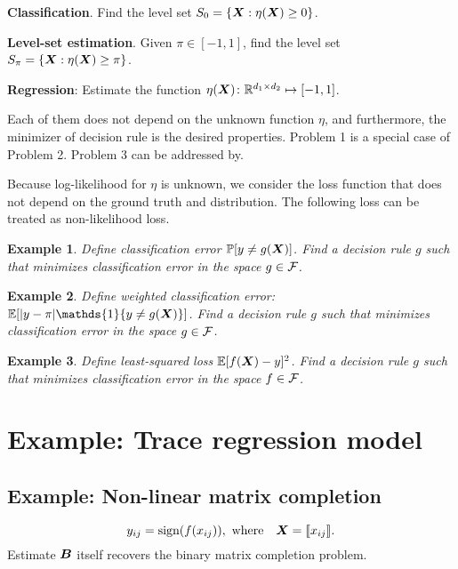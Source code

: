 \documentclass[12pt]{article}
\newtheorem{example}{Example}
\begin{document}
{\bf Classification}. Find the level set $S_{0}=\{\bm X: \eta(\bm X) \geq 0\}$. 

{\bf Level-set estimation}. Given $\pi\in[-1,1]$, find the level set $S_{\pi}=\{\bm X: \eta(\bm X)\geq \pi\}$.

{\bf Regression}: Estimate the function $\eta(\bm X)\colon \mathbb{R}^{d_1\times d_2} \mapsto [-1,1]$. 

Each of them does not depend on the unknown function $\eta$, and furthermore, the minimizer of decision rule is the desired properties. Problem 1 is a special case of Problem 2. Problem 3 can be addressed by. 


Because log-likelihood for $\eta $ is unknown, we consider the loss function that does not depend on the ground truth and distribution. The following loss can be treated as non-likelihood loss. 

\begin{example}
Define classification error $\mathbb{P}[y \neq g(\bm X)]$. Find a decision rule $g$ such that minimizes classification error in the space $g\in\mathcal{F}$. 
\end{example}

\begin{example} Define weighted classification error: $\mathbb{E}[|y - \pi| \mathds{1}\{y\neq g(\mX)\}]$. Find a decision rule $g$ such that minimizes classification error in the space $g\in\mathcal{F}$. 

\end{example}

\begin{example}
Define least-squared loss $\mathbb{E}[f(\bm X)-y]^2$. Find a decision rule $g$ such that minimizes classification error in the space $f \in\mathcal{F}$.
\end{example}


\section{Example: Trace regression model}
\subsection{Example: Non-linear matrix completion}
\[
y_{ij} = \text{sign}(f(x_{ij})), \ \text{where} \quad \mX=\entry{x_{ij}}.
\]
Estimate $\bm B$ itself recovers the binary matrix completion problem. 
\end{document}
